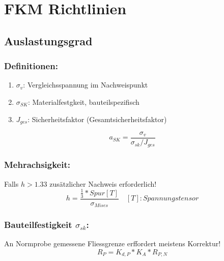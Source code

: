 \section{FKM Richtlinien}{}
 \subsection{Auslastungsgrad}
 
    \subsubsection{Definitionen:}
    \begin{enumerate}[noitemsep]
        \item $\sigma_{v}$: Vergleichsspannung im Nachweispunkt \\
        \item $\sigma_{SK}$: Materialfestgkeit, bauteilspezifisch \\
        \item $J_{ges}$: Sicherheitsfaktor (Gesamtsicherheitsfaktor) \\
    \end{enumerate}
\[a_{SK} = \frac{\sigma_{v}}{\sigma_{sk}/J_{ges}} \]

\subsubsection{Mehrachsigkeit:}
Falls $h > 1.33$ zusätzlicher Nachweis erforderlich! 
\[ h = \frac{\frac{1}{3}*Spur[T]}{\sigma_{Mises}} \quad [T]: Spannungstensor\]
\subsubsection{Bauteilfestigkeit $\sigma_{sk}$:}
An Normprobe gemessene Fliessgrenze erffordert meistens Korrektur!
\[R_P = K_{d,P}*K_A*R_{P,N}\]

